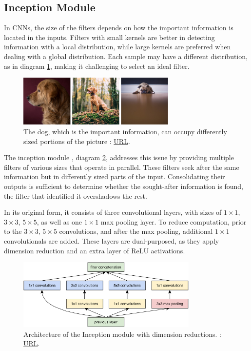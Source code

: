 \subsection{Inception Module}\label{Inception Module}
In CNNs, the size of the filters depends on how the important information is located in the inputs. Filters with small kernels are better in detecting information with a local distribution, while large kernels are preferred when dealing with a global distribution. Each sample may have a different distribution, as in diagram \ref{fig:dogs_inception}, making it challenging to select an ideal filter.
\begin{figure}[H]
    \centering
        \includegraphics[width=0.7\textwidth]{Images/dogs_inception.jpg}
        \decoRule
        \caption[Variety of distribution of information.]{The dog, which is the important information, can occupy differently sized portions of the picture \cite{dogs_image}: \href{https://towardsdatascience.com/a-simple-guide-to-the-versions-of-the-inception-network-7fc52b863202}{URL}.}
        \label{fig:dogs_inception}
\end{figure}

The inception module \cite{inception_module}, diagram \ref{fig:inception}, addresses this issue by providing multiple filters of various sizes that operate in parallel. These filters seek after the same information but in differently sized parts of the input. Consolidating their outputs is sufficient to determine whether the sought-after information is found, the filter that identified it overshadows the rest.

In its original form, it consists of three convolutional layers, with sizes of \(1\times1\), \(3\times3\), \(5\times5\), as well as one \(1\times1\) max pooling layer. To reduce computation, prior to the \(3\times3\), \(5\times5\) convolutions, and after the max pooling, additional \(1\times1\) convolutionals are added. These layers are dual-purposed, as they apply dimension reduction and an extra layer of ReLU activations.
\begin{figure}[H]
    \centering
        \includegraphics[width=0.8\textwidth]{Images/ANNArchitectures/inception_module.png}
        \decoRule
        \caption[Inception Module]{Architecture of the Inception module with dimension reductions. \cite{inception_module}: \href{https://arxiv.org/abs/1409.4842}{URL}.}
        \label{fig:inception}
\end{figure}


